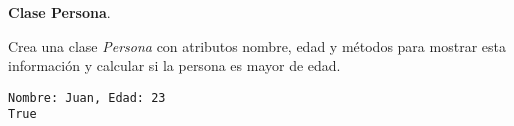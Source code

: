 \begin{exercise}{\rm \textbf{Clase Persona}.

Crea una clase \emph{Persona} con atributos nombre, edad y métodos para
mostrar esta información y calcular si la persona es mayor de edad.

\begin{Shaded}
\begin{Highlighting}[]
     \NormalTok{(}
        \OperatorTok{=}
        \OperatorTok{=}

    \NormalTok{):}
        \NormalTok{(}\SpecialCharTok{\{}\SpecialCharTok{\}}\SpecialCharTok{\{}\SpecialCharTok{\}}\SpecialStringTok{\textquotesingle{}}\NormalTok{)}

    \NormalTok{):}
         \OperatorTok{\textgreater{}=} \NormalTok{:}
             
        \NormalTok{:}
             

\OperatorTok{=}\NormalTok{, }\NormalTok{)}
\end{Highlighting}
\end{Shaded}

\begin{verbatim}
Nombre: Juan, Edad: 23
True
\end{verbatim}
}\end{exercise}


